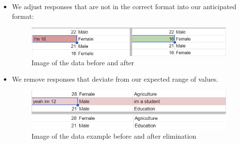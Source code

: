 \begin{itemize}
                    \item We adjust responses that are not in the correct format into our anticipated format:
                        \begin{figure}[H]
                            \centering
                            \includegraphics[scale=0.5]{graphics/data/Wrongformat3.jpg}
                            \caption{Image of the data before and after}
                        \end{figure}
                        
                    \item We remove responses that deviate from our expected range of values.
                        \begin{figure}[H]
                            \centering
                            \includegraphics[scale=0.6]{graphics/data/eliminate3.jpg}
                            \caption{Image of the data example before and after elimination}
                        \end{figure} 


\end{itemize}
